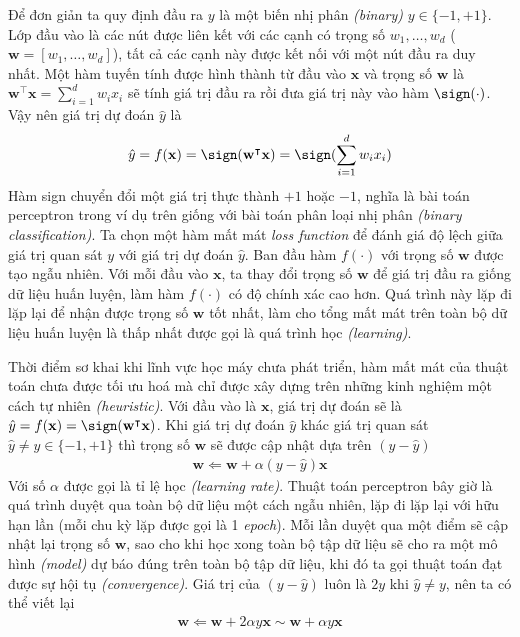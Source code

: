 Để đơn giản ta quy định đầu ra $y$ là một biến nhị phân \textit{(binary)} $y\in\{-1,+1\}$. Lớp đầu vào là các nút được liên kết với các cạnh có trọng số $w_1,\dots,w_d$ ($\mathbf{w}=[w_1,\dots,w_d]$), tất cả các cạnh này được kết nối với một nút đầu ra duy nhất. Một hàm tuyến tính được hình thành từ đầu vào $\mathbf{x}$ và trọng số $\mathbf{w}$ là $\mathbf{w^\intercal x}=\sum^d_{i=1}w_ix_i$ sẽ tính giá trị đầu ra rồi đưa giá trị này vào hàm $\sign(\cdot)$. Vậy nên giá trị dự đoán $\hat{y}$ là
\begin{align}
    \hat{y}=f(\mathbf{x})=\sign(\mathbf{w^\intercal x})=\sign(\sum^d_{i=1}w_ix_i)
\end{align}
Hàm sign chuyển đổi một giá trị thực thành $+1$ hoặc $-1$, nghĩa là bài toán perceptron trong ví dụ trên giống với bài toán phân loại nhị phân \textit{(binary classification)}. Ta chọn một hàm mất mát \textit{loss function} để đánh giá độ lệch giữa giá trị quan sát $y$ với giá trị dự đoán $\hat{y}$. Ban đầu hàm $f(\cdot)$ với trọng số $\mathbf{w}$ được tạo ngẫu nhiên. Với mỗi đầu vào $\mathbf{x}$, ta thay đổi trọng số $\mathbf{w}$ để giá trị đầu ra giống dữ liệu huấn luyện, làm hàm $f(\cdot)$ có độ chính xác cao hơn. Quá trình này lặp đi lặp lại để nhận được trọng số $\mathbf{w}$ tốt nhất, làm cho tổng mất mát trên toàn bộ dữ liệu huấn luyện là thấp nhất được gọi là quá trình học \textit{(learning)}.

Thời điểm sơ khai khi lĩnh vực học máy chưa phát triển, hàm mất mát của thuật toán chưa được tối ưu hoá mà chỉ được xây dựng trên những kinh nghiệm một cách tự nhiên \textit{(heuristic)}. Với đầu vào là $\mathbf{x}$, giá trị dự đoán sẽ là $\hat{y}=f(\mathbf{x})=\sign(\mathbf{w^\intercal x})$. Khi giá trị dự đoán $\hat{y}$ khác giá trị quan sát $\hat{y}\neq y\in\{-1,+1\}$ thì trọng số $\mathbf{w}$ sẽ được cập nhật dựa trên $(y-\hat{y})$
\begin{align}
    \mathbf{w}\Leftarrow\mathbf{w}+\alpha(y-\hat{y})\mathbf{x}
\end{align}
Với số $\alpha$ được gọi là tỉ lệ học \textit{(learning rate)}. Thuật toán perceptron bây giờ là quá trình duyệt qua toàn bộ dữ liệu một cách ngẫu nhiên, lặp đi lặp lại với hữu hạn lần (mỗi chu kỳ lặp được gọi là 1 \textit{epoch}). Mỗi lần duyệt qua một điểm sẽ cập nhật lại trọng số $\mathbf{w}$, sao cho khi học xong toàn bộ tập dữ liệu sẽ cho ra một mô hình \textit{(model)} dự báo đúng trên toàn bộ tập dữ liệu, khi đó ta gọi thuật toán đạt được sự hội tụ \textit{(convergence)}. Giá trị của $(y-\hat{y})$ luôn là $2y$ khi $\hat{y}\neq y$, nên ta có thể viết lại
\begin{align}
    \mathbf{w}\Leftarrow\mathbf{w}+2\alpha y\mathbf{x}\sim\mathbf{w}+\alpha y\mathbf{x}
\end{align}

